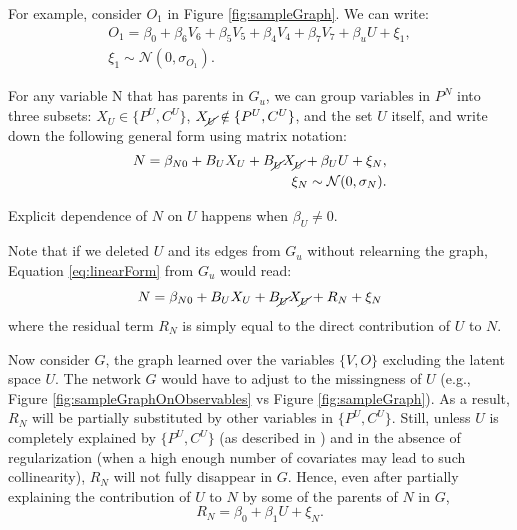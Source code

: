 \documentclass[letterpaper]{article}
\begin{document}
For example, consider $O_1$ in Figure \ref{fig:sampleGraph}.  We can write:
\begin{equation}
\begin{split}
O_1 = \beta_0 + \beta_6V_6 + \beta_5V_5 + \beta_4V_4 + \beta_7V_7 + \beta_uU + \xi_1,\\ \xi_1 \sim \mathcal{N}(0, \sigma_{O_1}).
\end{split}
\end{equation}

For any variable N that has parents in $G_u$, we can group variables in $P^N$ into three subsets: $X_U \in \{P^U, C^U\}$, $X_{\cancel{U}} \notin \{P^U, C^U\}$, and the set $U$ itself, and write down the following general form using matrix notation:
\begin{equation}
\begin{split}
N = \beta_{N0} + B_U X_U + B_{\cancel{U}} X_{\cancel{U}} + \beta_U U + \xi_N,\\\xi_N \sim \mathcal{N}(0, \sigma_{N}).
\end{split}
\label{eq:linearForm}
\end{equation}

Explicit dependence of $N$ on $U$ happens when $\beta_U \neq 0$.  

Note that if we deleted $U$ and its edges from $G_u$ without relearning the graph, Equation \ref{eq:linearForm} from $G_u$ would read:
\begin{equation}
N = \beta_{N0} + B_U X_U + B_{\cancel{U}} X_{\cancel{U}} + R_N + \xi_N 
\label{eq:linearFormNoU}
\end{equation}
where the residual term $R_N$ is simply equal to the direct
contribution of $U$ to $N$.

Now consider $G$,  the graph learned over the variables $\{V, O\}$ excluding the latent space $U$. The network $G$ would have to adjust to the missingness of $U$ (e.g., Figure \ref{fig:sampleGraphOnObservables} vs Figure \ref{fig:sampleGraph}).  As a result, $R_N$ will be partially substituted by other variables in $\{P^U, C^U\}$.  Still, unless $U$ is completely explained by $\{P^U, C^U\}$ (as described in \cite{damour_multi-cause_2019}) and in the absence of regularization (when a high enough number of covariates may lead to such collinearity), $R_N$ will not fully disappear in $G$.  Hence, even after partially explaining the contribution of $U$ to $N$ by some of the parents of $N$ in $G$, 
\begin{equation}
R_N = \beta_0 + \beta_1 U + \xi_N.
\label{eq:residualColumn}
\end{equation}
\end{document}
